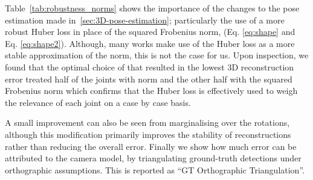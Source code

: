 \documentclass[10pt,twocolumn,letterpaper]{article}
\begin{document}
\begin{table}[tb]
\caption[width=\columnwidth] {Reconstruction error for different
   variants of our approach (see section \ref{sec:3D-pose-estimation}
   for details.) Huber loss (2 cameras) shows the mean and standard
   deviation of the reconstruction using only a pair of cameras at
   right angles with one another. GT Orthographic Triangulation shows
   the error due to the use of an orthographic camera, i.e. the the
   reconstruction error given perfect 
   detections.\label{tab:robustness_norms}}
\end{table}

Table~\ref{tab:robustness_norms} shows the importance of the changes to the pose
estimation made in~\ref{sec:3D-pose-estimation}; particularly the use of a more
robust Huber loss in place of the squared Frobenius norm, (Eq. \ref{eq:shape}
and Eq. \ref{eq:shape2}). 
Although, many works make use of the Huber loss as a more stable
approximation of the  norm, this is not the case for us. Upon
inspection, we found that the optimal choice of  that resulted in
the lowest 3D reconstruction error treated half of the joints with
 norm and the other half with the squared Frobenius norm which
confirms that the Huber loss is effectively used to weigh the
relevance of each joint on a case by case basis.




A small improvement can also be seen from marginalising over the
rotations, although this modification primarily  improves the stability of
reconstructions rather than reducing the overall error. Finally we show how much
error can be attributed to the camera model, by
triangulating ground-truth detections under orthographic assumptions. This is
reported as ``GT Orthographic Triangulation''. 
\end{document}
